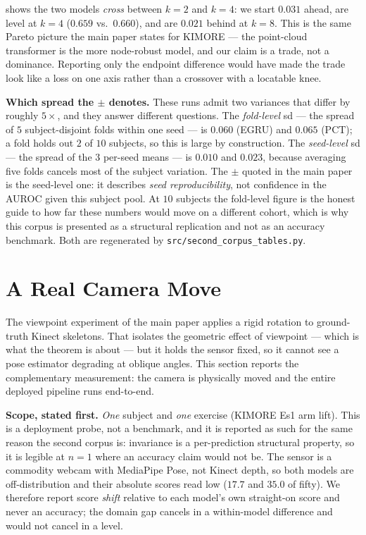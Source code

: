 \documentclass[10pt,twocolumn,letterpaper]{article}
\begin{document}
 shows the two models \emph{cross} between $k{=}2$ and $k{=}4$: we start
$0.031$ ahead, are level at $k{=}4$ ($0.659$ vs.\ $0.660$), and are $0.021$ behind at $k{=}8$. This is
the same Pareto picture the main paper states for KIMORE --- the point-cloud transformer is the more
node-robust model, and our claim is a trade, not a dominance. Reporting only the endpoint difference
would have made the trade look like a loss on one axis rather than a crossover with a locatable knee.

\textbf{Which spread the $\pm$ denotes.} These runs admit two variances that differ by roughly $5\times$,
and they answer different questions. The \emph{fold-level} sd --- the spread of $5$ subject-disjoint
folds within one seed --- is $0.060$ (EGRU) and $0.065$ (PCT); a fold holds out $2$ of $10$ subjects, so
this is large by construction. The \emph{seed-level} sd --- the spread of the $3$ per-seed means --- is
$0.010$ and $0.023$, because averaging five folds cancels most of the subject variation. The
$\pm$ quoted in the main paper is the seed-level one: it describes \emph{seed reproducibility}, not
confidence in the AUROC given this subject pool. At $10$ subjects the fold-level figure is the honest
guide to how far these numbers would move on a different cohort, which is why this corpus is presented
as a structural replication and not as an accuracy benchmark. Both are regenerated by
\texttt{src/second\_corpus\_tables.py}.

\section{A Real Camera Move}\label{sec:supp:realview}
The viewpoint experiment of the main paper applies a rigid rotation to ground-truth Kinect
skeletons. That isolates the geometric effect of viewpoint --- which is what the theorem is about ---
but it holds the sensor fixed, so it cannot see a pose estimator degrading at oblique angles. This
section reports the complementary measurement: the camera is physically moved and the entire
deployed pipeline runs end-to-end.

\textbf{Scope, stated first.} \emph{One} subject and \emph{one} exercise (KIMORE Es1 arm lift). This
is a deployment probe, not a benchmark, and it is reported as such for the same reason the second
corpus is: invariance is a per-prediction structural property, so it is legible at $n{=}1$ where an
accuracy claim would not be. The sensor is a commodity webcam with MediaPipe Pose, not Kinect depth,
so both models are off-distribution and their absolute scores read low ($17.7$ and $35.0$ of fifty).
We therefore report score \emph{shift} relative to each model's own straight-on score and never an
accuracy; the domain gap cancels in a within-model difference and would not cancel in a level.
\end{document}
